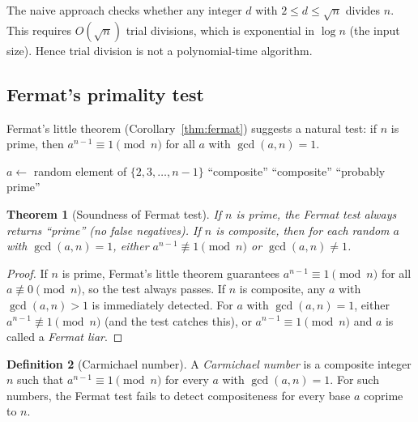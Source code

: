 \documentclass[twoside,12pt]{book}
\theoremstyle{plain}
\newtheorem{theorem}{Theorem}[chapter]
\theoremstyle{definition}
\newtheorem{definition}[theorem]{Definition}
\theoremstyle{remark}
\begin{document}
The naive approach checks whether any integer $d$ with $2 \leq d \leq \sqrt{n}$ divides $n$. This requires $O(\sqrt{n})$ trial divisions, which is exponential in $\log n$ (the input size). Hence trial division is not a polynomial-time algorithm.

\subsection{Fermat's primality test}

Fermat's little theorem (Corollary~\ref{thm:fermat}) suggests a natural test: if $n$ is prime, then $a^{n-1} \equiv 1 \pmod{n}$ for all $a$ with $\gcd(a, n) = 1$.

\begin{algorithm}
\caption{Fermat Primality Test}
\label{alg:fermat}
\begin{algorithmic}[1]
 
        \State $a \gets$ random element of $\{2, 3, \ldots, n-1\}$
            \State \Return ``composite'' 
        \EndIf
            \State \Return ``composite''
        \EndIf
    \EndFor
    \State \Return ``probably prime''
\EndFunction
\end{algorithmic}
\end{algorithm}

\begin{theorem}[Soundness of Fermat test]
\label{thm:fermat-test}
If $n$ is prime, the Fermat test always returns ``prime'' (no false negatives). If $n$ is composite, then for each random $a$ with $\gcd(a, n) = 1$, either $a^{n-1} \not\equiv 1 \pmod{n}$ or $\gcd(a, n) \neq 1$.
\end{theorem}

\begin{proof}
If $n$ is prime, Fermat's little theorem guarantees $a^{n-1} \equiv 1 \pmod{n}$ for all $a \not\equiv 0 \pmod{n}$, so the test always passes. If $n$ is composite, any $a$ with $\gcd(a, n) > 1$ is immediately detected. For $a$ with $\gcd(a, n) = 1$, either $a^{n-1} \not\equiv 1 \pmod{n}$ (and the test catches this), or $a^{n-1} \equiv 1 \pmod{n}$ and $a$ is called a \emph{Fermat liar}.
\end{proof}

\begin{definition}[Carmichael number]
A \emph{Carmichael number} is a composite integer $n$ such that $a^{n-1} \equiv 1 \pmod{n}$ for every $a$ with $\gcd(a, n) = 1$. For such numbers, the Fermat test fails to detect compositeness for every base $a$ coprime to $n$.
\end{definition}
\end{document}
